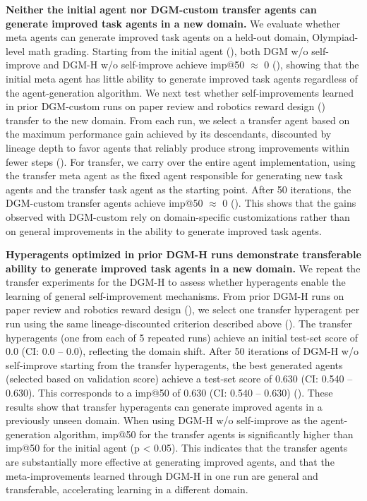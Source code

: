 \documentclass{article}
\begin{document}
\textbf{Neither the initial agent nor DGM-custom transfer agents can generate improved task agents in a new domain.}
We evaluate whether meta agents can generate improved task agents on a held-out domain, Olympiad-level math grading. Starting from the initial agent (), both DGM w/o self-improve and DGM-H w/o self-improve achieve imp@50 $\approx$ 0 (), showing that the initial meta agent has little ability to generate improved task agents regardless of the agent-generation algorithm.
We next test whether self-improvements learned in prior DGM-custom runs on paper review and robotics reward design () transfer to the new domain. From each run, we select a transfer agent based on the maximum performance gain achieved by its descendants, discounted by lineage depth to favor agents that reliably produce strong improvements within fewer steps (). For transfer, we carry over the entire agent implementation, using the transfer meta agent as the fixed agent responsible for generating new task agents and the transfer task agent as the starting point.
After 50 iterations, the DGM-custom transfer agents achieve imp@50 $\approx$ 0 (). This shows that the gains observed with DGM-custom rely on domain-specific customizations rather than on general improvements in the ability to generate improved task agents.

\textbf{Hyperagents optimized in prior DGM-H runs demonstrate transferable ability to generate improved task agents in a new domain.}
We repeat the transfer experiments for the DGM-H to assess whether hyperagents enable the learning of general self-improvement mechanisms. From prior DGM-H runs on paper review and robotics reward design (), we select one transfer hyperagent per run using the same lineage-discounted criterion described above (). The transfer hyperagents (one from each of 5 repeated runs) achieve an initial test-set score of 0.0 (CI: 0.0 -- 0.0), reflecting the domain shift. After 50 iterations of DGM-H w/o self-improve starting from the transfer hyperagents, the best generated agents (selected based on validation score) achieve a test-set score of 0.630 (CI: 0.540 -- 0.630). This corresponds to a imp@50 of 0.630 (CI: 0.540 -- 0.630) (). These results show that transfer hyperagents can generate improved agents in a previously unseen domain. When using DGM-H w/o self-improve as the agent-generation algorithm, imp@50 for the transfer agents is significantly higher than imp@50 for the initial agent (p < 0.05). This indicates that the transfer agents are substantially more effective at generating improved agents, and that the meta-improvements learned through DGM-H in one run are general and transferable, accelerating learning in a different domain.
\end{document}
